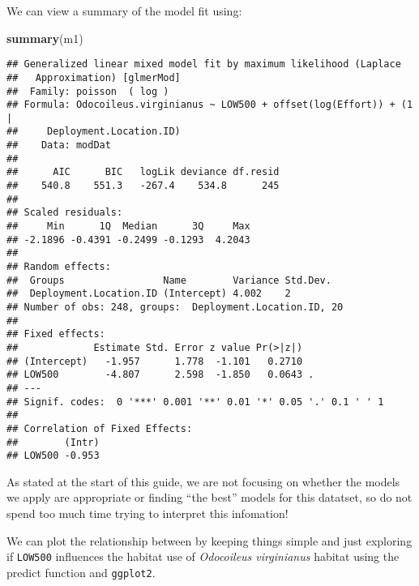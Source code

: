 \documentclass[]{book}
\newenvironment{Shaded}{\begin{snugshade}}{\end{snugshade}}
\newcommand{\KeywordTok}[1]{\textcolor[rgb]{0.13,0.29,0.53}{\textbf{#1}}}
\newcommand{\NormalTok}[1]{#1}
\begin{document}
We can view a summary of the model fit using:

\begin{Shaded}
\begin{Highlighting}[]
\KeywordTok{summary}\NormalTok{(m1)}
\end{Highlighting}
\end{Shaded}

\begin{verbatim}
## Generalized linear mixed model fit by maximum likelihood (Laplace
##   Approximation) [glmerMod]
##  Family: poisson  ( log )
## Formula: Odocoileus.virginianus ~ LOW500 + offset(log(Effort)) + (1 |  
##     Deployment.Location.ID)
##    Data: modDat
## 
##      AIC      BIC   logLik deviance df.resid 
##    540.8    551.3   -267.4    534.8      245 
## 
## Scaled residuals: 
##     Min      1Q  Median      3Q     Max 
## -2.1896 -0.4391 -0.2499 -0.1293  4.2043 
## 
## Random effects:
##  Groups                 Name        Variance Std.Dev.
##  Deployment.Location.ID (Intercept) 4.002    2       
## Number of obs: 248, groups:  Deployment.Location.ID, 20
## 
## Fixed effects:
##             Estimate Std. Error z value Pr(>|z|)  
## (Intercept)   -1.957      1.778  -1.101   0.2710  
## LOW500        -4.807      2.598  -1.850   0.0643 .
## ---
## Signif. codes:  0 '***' 0.001 '**' 0.01 '*' 0.05 '.' 0.1 ' ' 1
## 
## Correlation of Fixed Effects:
##        (Intr)
## LOW500 -0.953
\end{verbatim}

As stated at the start of this guide, we are not focusing on whether the
models we apply are appropriate or finding ``the best'' models for this
datatset, so do not spend too much time trying to interpret this
infomation!

We can plot the relationship between by keeping things simple and just
exploring if \texttt{LOW500} influences the habitat use of
\emph{Odocoileus virginianus} habitat using the predict function and
\texttt{ggplot2}.
\end{document}

